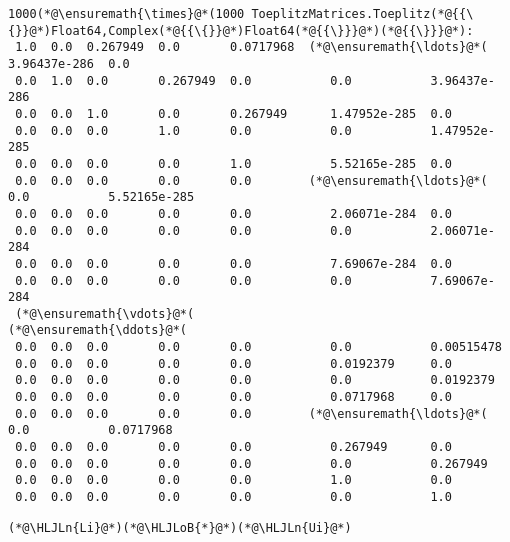 \documentclass[12pt,landscape]{article}
\newcommand{\HLJLn}[1]{#1}
\newcommand{\HLJLoB}[1]{\textcolor[RGB]{102,102,102}{\textbf{#1}}}
\begin{document}
{\begin{lstlisting}
1000(*@\ensuremath{\times}@*(1000 ToeplitzMatrices.Toeplitz(*@{{\{}}@*)Float64,Complex(*@{{\{}}@*)Float64(*@{{\}}}@*)(*@{{\}}}@*):
 1.0  0.0  0.267949  0.0       0.0717968  (*@\ensuremath{\ldots}@*(  3.96437e-286  0.0
 0.0  1.0  0.0       0.267949  0.0           0.0           3.96437e-286
 0.0  0.0  1.0       0.0       0.267949      1.47952e-285  0.0
 0.0  0.0  0.0       1.0       0.0           0.0           1.47952e-285
 0.0  0.0  0.0       0.0       1.0           5.52165e-285  0.0
 0.0  0.0  0.0       0.0       0.0        (*@\ensuremath{\ldots}@*(  0.0           5.52165e-285
 0.0  0.0  0.0       0.0       0.0           2.06071e-284  0.0
 0.0  0.0  0.0       0.0       0.0           0.0           2.06071e-284
 0.0  0.0  0.0       0.0       0.0           7.69067e-284  0.0
 0.0  0.0  0.0       0.0       0.0           0.0           7.69067e-284
 (*@\ensuremath{\vdots}@*(                                        (*@\ensuremath{\ddots}@*(                
 0.0  0.0  0.0       0.0       0.0           0.0           0.00515478
 0.0  0.0  0.0       0.0       0.0           0.0192379     0.0
 0.0  0.0  0.0       0.0       0.0           0.0           0.0192379
 0.0  0.0  0.0       0.0       0.0           0.0717968     0.0
 0.0  0.0  0.0       0.0       0.0        (*@\ensuremath{\ldots}@*(  0.0           0.0717968
 0.0  0.0  0.0       0.0       0.0           0.267949      0.0
 0.0  0.0  0.0       0.0       0.0           0.0           0.267949
 0.0  0.0  0.0       0.0       0.0           1.0           0.0
 0.0  0.0  0.0       0.0       0.0           0.0           1.0
\end{lstlisting}


\begin{lstlisting}
(*@\HLJLn{Li}@*)(*@\HLJLoB{*}@*)(*@\HLJLn{Ui}@*)
\end{lstlisting}

}
\end{document}
